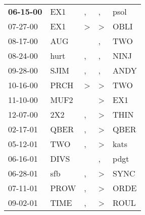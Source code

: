 \begin{supertabular}{p{0.07\textwidth}p{0.06\textwidth}p{0.02\textwidth}p{0.02\textwidth}p{0.06\textwidth}}
 \textbf{06-15-00\textsuperscript{}} &            EX1\textsuperscript{} &                , &                , &           psol\textsuperscript{} \\
          07-27-00\textsuperscript{} &            EX1\textsuperscript{} &     \textgreater &     \textgreater &           OBLI\textsuperscript{} \\
          08-17-00\textsuperscript{} &            AUG\textsuperscript{} &                  &                , &            TWO\textsuperscript{} \\
          08-24-00\textsuperscript{} &           hurt\textsuperscript{} &                , &                , &           NINJ\textsuperscript{} \\
          09-28-00\textsuperscript{} &           SJIM\textsuperscript{} &                , &                , &           ANDY\textsuperscript{} \\
          10-16-00\textsuperscript{} &           PRCH\textsuperscript{} &     \textgreater &     \textgreater &            TWO\textsuperscript{} \\
          11-10-00\textsuperscript{} &           MUF2\textsuperscript{} &                  &     \textgreater &            EX1\textsuperscript{} \\
          12-07-00\textsuperscript{} &            2X2\textsuperscript{} &                , &     \textgreater &           THIN\textsuperscript{} \\
          02-17-01\textsuperscript{} &           QBER\textsuperscript{} &                , &     \textgreater &           QBER\textsuperscript{} \\
          05-12-01\textsuperscript{} &            TWO\textsuperscript{} &                , &     \textgreater &           kats\textsuperscript{} \\
          06-16-01\textsuperscript{} &           DIVS\textsuperscript{} &                  &                , &           pdgt\textsuperscript{} \\
          06-28-01\textsuperscript{} &            sfb\textsuperscript{} &                , &     \textgreater &           SYNC\textsuperscript{} \\
          07-11-01\textsuperscript{} &           PROW\textsuperscript{} &                , &     \textgreater &           ORDE\textsuperscript{} \\
          09-02-01\textsuperscript{} &           TIME\textsuperscript{} &                , &     \textgreater &           ROUL\textsuperscript{} \\

\end{supertabular}
